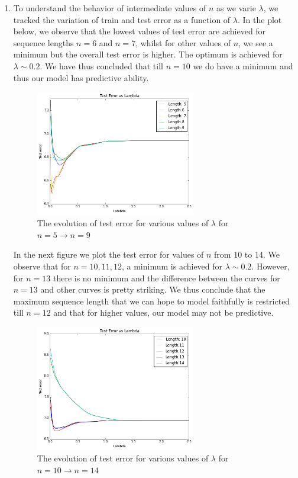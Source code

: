 \documentclass[a4paper, 12pt]{article}
\begin{document}
\begin{enumerate}
\item 
To understand the behavior of intermediate values of $n$ as we varie $\lambda$, we tracked the variation of train and test error as a function of $\lambda$. In the plot below, we observe that the lowest values of test error are achieved for sequence lengths $n=6$ and $n=7$, whilst for other values of $n$, we see a minimum but the overall test error is higher. The optimum is achieved for $\lambda \sim 0.2$. We have thus concluded that till $n=10$ we do have a minimum and thus our model has predictive ability. 

\begin{figure}[!h]
\centering
\label{test_error_lambda_2}
\includegraphics[width=7cm]{Images/test_error_lambda_2.png}
\caption{The evolution of test error for various values of $\lambda$ for $n=5 \rightarrow n=9$}
\end{figure}

In the next figure we plot the test error for values of $n$ from 10 to 14. We observe that for $n=10,11,12$, a minimum is achieved for $\lambda \sim 0.2$. However, for $n=13$ there is no minimum and the difference between the curves for $n=13$ and other curves is pretty striking. We thus conclude that the maximum sequence length that we can hope to model faithfully is restricted till $n=12$ and that for higher values, our model may not be predictive. 

\begin{figure}[!h]
\centering
\label{test_error_lambda_3}
\includegraphics[width=7cm]{Images/test_error_lambda_3.png}
\caption{The evolution of test error for various values of $\lambda$ for $n=10 \rightarrow n=14$}
\end{figure}


\end{enumerate}
\end{document}
